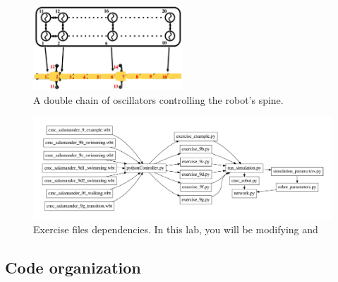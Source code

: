 \documentclass{cmc}
\begin{document}
\begin{figure}[h]
  \centering
  \includegraphics[width=0.5\textwidth]{figures/model_controller.png}
  \caption[Controller model]{A double chain of oscillators controlling
    the robot’s spine.}
  \label{fig:controller-model}
\end{figure}

\begin{figure}[ht]
  \centering \includegraphics[width=1.0\textwidth]{figures/files}
  \caption{\label{fig:files} Exercise files dependencies. In this lab, you will
    be modifying  and }
\end{figure}


\subsection*{Code organization}
\label{subsec:code}
\end{document}
